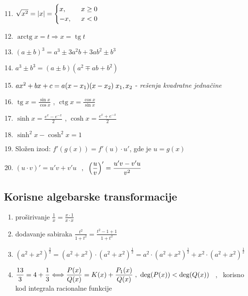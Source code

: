 \documentclass{article}
\DeclareMathOperator{\tg}{tg}
\DeclareMathOperator{\ctg}{ctg}
\DeclareMathOperator{\arctg}{arctg}
\begin{document}
\begin{minipage}[t]{0.5\textwidth}
\begin{enumerate}[label={(\arabic*)}]
\setcounter{enumi}{10}
	\item {	$ \sqrt{x^2} = |x| =  \begin{cases} x, \hspace{2mm} & x \geq 0 \\ -x, \hspace{2mm} & x < 0 \\	\end{cases} $ }
	\item $ \arctg x = t  \Longrightarrow x = \tg t $
	\item $ (a\pm b)^3 = a ^ { 3} \pm 3a ^ { 2} b + 3a b ^ { 2} \pm b ^ { 3} $
	\item $ \displaystyle a^3\pm b^3 = (a \pm b)(a^2 \mp ab + b^2)  $
	\item $ax^2 + bx + c = a(x-x_1)(x-x_2) \\ \hspace{1mm} x_1,x_2$ - \textit{rešenja kvadratne jednačine}
	\item $\displaystyle \tg x = \frac{\sin x}{\cos x}$ , \hspace{1mm}  $ \displaystyle \ctg x = \frac{\cos x}{\sin x} $
	\item $\displaystyle \sinh x = \frac{e^{x} - e^{-x}}{2}$ , \hspace{1mm} $\displaystyle \cosh x = \frac{e^{x} + e^{-x}}{2}$
	\item $\displaystyle \sinh^2 x - \cosh^2 x = 1$ 
	\item Složen izod: $ f'(g(x)) = f'(u)\cdot u'$, gde je $u = g(x)$
	\item $\displaystyle (u\cdot v)' = u'v + v'u$ $\ ,\hspace{2mm}  \displaystyle \Big(\frac{u}{v}\Big)' = \frac{u'v - v'u}{v^2} $
\end{enumerate}
\end{minipage}

\vspace{2mm} 

\subsection{Korisne algebarske transformacije}
\begin{enumerate}[label={(\arabic*)}]
\item proširivanje $\displaystyle \frac{1}{x} = \frac { x \cdot 1} { x \cdot x}$
    \item dodavanje sabiraka $\displaystyle \frac{t^2}{1 + t^2} = \frac {t^2 -1 + 1}{1 + t^2}$
       \item $(a^2+x^2)^{\frac{3}{2}} = (a^2+x^2) \cdot (a^2+x^2)^{\frac{1}{2}}  = a^2 \cdot (a^2+x^2)^{\frac{1}{2}} + x^2 \cdot (a^2+x^2)^{\frac{1}{2}}$

       \item $\displaystyle \frac{13}{3} = 4 + \frac{1}{3}  \Longleftrightarrow \frac{P(x)}{Q(x)} = K(x) + \frac{P_1(x)}{Q(x)} \hspace{1mm} ,\ \deg(P(x)) < \deg(Q(x))$ \ , \ korisno kod integrala racionalne funkcije

\end{enumerate}
\end{document}
